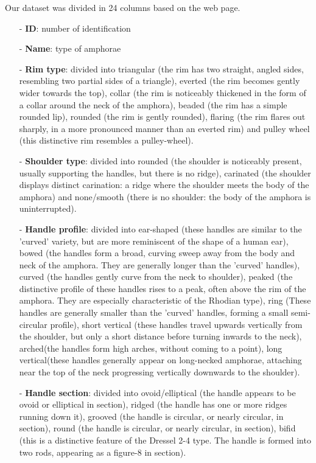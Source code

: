 \documentclass[10pt,a4paper]{article}
\begin{document}
\newpage


Our dataset was divided in 24 columns based on the web page. 

\begin{itemize}
\item[-] \textbf{ID}: number of identification

\item[-] \textbf{Name}: type of amphorae 

\item[-] \textbf{Rim type}: divided into triangular (the rim has two straight, angled sides, resembling two partial sides of a triangle), everted (the rim becomes gently wider towards the top), collar (the rim is noticeably thickened in the form of a collar around the neck of the amphora), beaded (the rim has a simple rounded lip), rounded (the rim is gently rounded), flaring (the rim flares out sharply, in a more pronounced manner than an everted rim) and pulley wheel (this distinctive rim resembles a pulley-wheel). 

\item[-] \textbf{Shoulder type}: divided into rounded (the shoulder is noticeably present, usually supporting the handles, but there is no ridge), carinated (the shoulder displays distinct carination: a ridge where the shoulder meets the body of the amphora) and none/smooth (there is no shoulder: the body of the amphora is uninterrupted).

\item[-] \textbf{Handle profile}: divided into ear-shaped (these handles are similar to the 'curved' variety, but are more reminiscent of the shape of a human ear), bowed (the handles form a broad, curving sweep away from the body and neck of the amphora. They are generally longer than the 'curved' handles), curved (the handles gently curve from the neck to shoulder), peaked (the distinctive profile of these handles rises to a peak, often above the rim of the amphora. They are especially characteristic of the Rhodian type), ring (These handles are generally smaller than the 'curved' handles, forming a small semi-circular profile), short vertical (these handles travel upwards vertically from the shoulder, but only a short distance before turning inwards to the neck), arched(the handles form high arches, without coming to a point), long vertical(these handles generally appear on long-necked amphorae, attaching near the top of the neck progressing vertically downwards to the shoulder).

\item[-] \textbf{Handle section}: divided into ovoid/elliptical (the handle appears to be ovoid or elliptical in section), ridged (the handle has one or more ridges running down it), grooved (the handle is circular, or nearly circular, in section), round (the handle is circular, or nearly circular, in section), bifid (this is a distinctive feature of the Dressel 2-4 type. The handle is formed into two rods, appearing as a figure-8 in section).


\end{itemize}
\end{document}
